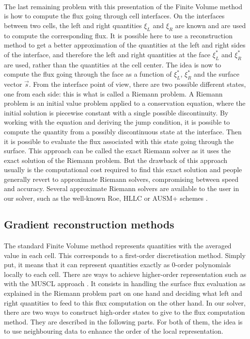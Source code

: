      \paragraph{}
      The last remaining problem with this presentation of the Finite Volume method is how to compute the flux going through cell interfaces.
      On the interfaces between two cells, the left and right quantities $\xi_L$ and $\xi_R$ are known and are used to compute the corresponding flux.
      It is possible here to use a reconstruction method to get a better approximation of the quantities at the left and right sides of the interface, and therefore the left and right quantities at the face $\xi_L^*$ and $\xi_R^*$ are used, rather than the quantities at the cell center.
      The idea is now to compute the flux going through the face as a function of $\xi_L^*$, $\xi_R^*$ and the surface vector $\vec{s}$.
      From the interface point of view, there are two possible different states, one from each side: this is what is called a Riemann problem.
      A Riemann problem is an initial value problem applied to a conservation equation, where the initial solution is piecewise constant with a single possible discontinuity.
      By working with the equation and deriving the jump condition, it is possible to compute the quantity from a possibly discontinuous state at the interface.
      Then it is possible to evaluate the flux associated with this state going through the surface.
      This approach can be called the exact Riemann solver as it uses the exact solution of the Riemann problem.
      But the drawback of this approach usually is the computational cost required to find this exact solution and people generally revert to approximate Riemann solvers, compromising between speed and accuracy.
      Several approximate Riemann solvers are available to the user in our solver, such as the well-known Roe, HLLC or AUSM+ schemes \cite{Roe1981, Toro2009}.


    \subsection{Gradient reconstruction methods}

      \paragraph{}
      The standard Finite Volume method represents quantities with the averaged value in each cell.
      This corresponds to a first-order discretisation method.
      Simply put, it means that it can represent quantities exactly as 0-order polynomials locally to each cell.
      There are ways to achieve higher-order representation such as with the MUSCL approach \cite{VanLeer1979}.
      It consists in handling the surface flux evaluation as explained in the Riemann problem part on one hand and deciding what left and right quantities to feed to this flux computation on the other hand.
      In our solver, there are two ways to construct high-order states to give to the flux computation method.
      They are described in the following parts.
      For both of them, the idea is to use neighbouring data to enhance the order of the local representation.


